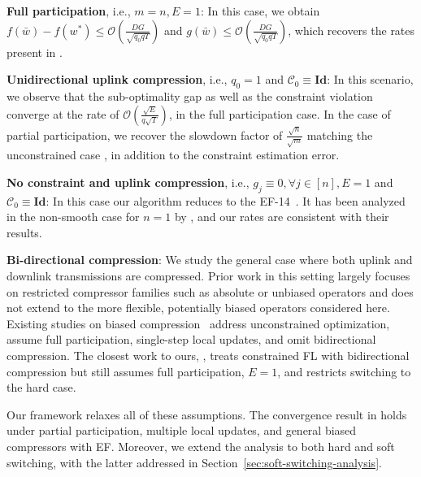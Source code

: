 \documentclass{article} %
\def\C{{\mathcal C}}
\def\bigO{{\mathcal{O}}}
\begin{document}
\noindent \textbf{Full participation}, i.e., $m=n, E=1$:  In this case, we obtain $f(\bar{w}) - f(w^*) \leq \bigO\left(\frac{DG}{\sqrt{q_0qT}}\right)$ and $g(\bar{w}) \leq \bigO\left(\frac{DG}{\sqrt{q_0qT}}\right)$, which recovers the rates present in \citet{islamov2025safe}.

\noindent \textbf{Unidirectional uplink compression}, i.e., $q_0 = 1$ and $\C_0 \equiv \mathbf{Id}$: In this scenario, we observe that the sub-optimality gap as well as the constraint violation converge at the rate of $\bigO\left(\frac{\sqrt{E}}{q\sqrt{T}}\right)$, in the full participation case. In the case of partial participation, we recover the slowdown factor of $\frac{\sqrt{n}}{\sqrt{m}}$ matching the unconstrained case \citep{li2023analysis}, in addition to the constraint estimation error. 

\noindent \textbf{No constraint and uplink compression}, i.e.,  $g_j \equiv 0, \forall j\in [n], E=1$ and $\C_0 \equiv \mathbf{Id}$: In this case our algorithm reduces to the EF-14~\citep{seide20141}. It has been analyzed in the non-smooth case for $n=1$ by \citet{karimireddy2019error}, and our rates are consistent with their results. 

\noindent \textbf{Bi-directional compression}: We study the general case where both uplink and downlink transmissions are compressed. Prior work in this setting largely focuses on restricted compressor families such as absolute \citep{tang2019doublesqueeze} or unbiased operators \citep{philippenko2021preserved,gruntkowska2023ef21,gruntkowska2024improving,tyurin20232direction} and does not extend to the more flexible, potentially biased operators considered here. Existing studies on biased compression~\citep{beznosikov2023biased,islamov2024towards,safaryan2021fednl} address unconstrained optimization, assume full participation, single-step local updates, and omit bidirectional compression. The closest work to ours, \citet{islamov2025safe}, treats constrained FL with bidirectional compression but still assumes full participation, $E=1$, and restricts switching to the hard case.

Our framework relaxes all of these assumptions. The convergence result in  holds under partial participation, multiple local updates, and general biased compressors with EF. Moreover, we extend the analysis to both hard and soft switching, with the latter addressed in Section~\ref{sec:soft-switching-analysis}.
\end{document}
